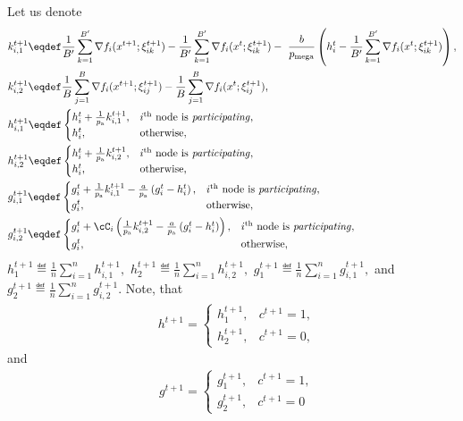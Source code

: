 \documentclass{article}
\newcommand*{\probavailable}{\ensuremath{p_{\textnormal{a}}}}
\newcommand*{\probmega}{\ensuremath{p_{\text{mega}}}}
\begin{document}
Let us denote
\begin{align*}
    &k^{t+1}_{i, 1} \eqdef \frac{1}{B'} \sum_{k=1}^{B'} \nabla f_i(x^{t+1};\xi_{ik}^{t+1}) - \frac{1}{B'} \sum_{k=1}^{B'} \nabla f_i(x^{t};\xi_{ik}^{t+1})-~\frac{b}{\probmega}\left(h^t_i - \frac{1}{B'} \sum_{k=1}^{B'} \nabla f_i(x^{t};\xi_{ik}^{t+1})\right), \\
    &k^{t+1}_{i, 2} \eqdef \frac{1}{B} \sum_{j=1}^{B}\nabla f_i(x^{t+1};\xi^{t+1}_{ij}) - \frac{1}{B} \sum_{j=1}^{B}\nabla f_i(x^{t};\xi^{t+1}_{ij}), \\
    &h^{t+1}_{i,1} \eqdef \begin{cases}
        h^t_i + \frac{1}{\probavailable} k^{t+1}_{i, 1},& i^{\textnormal{th}} \textnormal{ node is \textit{participating}}, \\
        h^t_i, & \textnormal{otherwise},
    \end{cases}  \\
    &h^{t+1}_{i,2} \eqdef \begin{cases}
        h^t_i + \frac{1}{\probavailable} k^{t+1}_{i, 2},& i^{\textnormal{th}} \textnormal{ node is \textit{participating}}, \\
        h^t_i, & \textnormal{otherwise},
    \end{cases}  \\
    &g^{t+1}_{i,1} \eqdef \begin{cases}
      g^{t}_i + \frac{1}{\probavailable}k^{t+1}_{i, 1} - \frac{a}{\probavailable} \left(g^t_i - h^t_i\right),& i^{\textnormal{th}} \textnormal{ node is \textit{participating}}, \\
      g^t_i, & \textnormal{otherwise},
    \end{cases}  \\
    &g^{t+1}_{i,2} \eqdef \begin{cases}
        g^t_i + \cC_i\left(\frac{1}{\probavailable}k^{t+1}_{i, 2} - \frac{a}{\probavailable} \left(g^t_i - h^{t}_i\right)\right),& i^{\textnormal{th}} \textnormal{ node is \textit{participating}}, \\
        g^t_i, & \textnormal{otherwise},
    \end{cases}  \\
\end{align*}
$h^{t+1}_{1} \eqdef \frac{1}{n}\sum_{i=1}^n h^{t+1}_{i,1},$ $h^{t+1}_{2} \eqdef \frac{1}{n}\sum_{i=1}^n h^{t+1}_{i,2},$ $g^{t+1}_{1} \eqdef \frac{1}{n}\sum_{i=1}^n g^{t+1}_{i,1},$ and $g^{t+1}_{2} \eqdef \frac{1}{n}\sum_{i=1}^n g^{t+1}_{i,2}.$ Note, that
\begin{align*}
  &h^{t+1} = \begin{cases}
    h^{t+1}_{1},& c^{t+1} = 1, \\
    h^{t+1}_{2},& c^{t+1} = 0,
\end{cases}
\end{align*}
and
\begin{align*}
  &g^{t+1} = \begin{cases}
    g^{t+1}_{1},& c^{t+1} = 1, \\
    g^{t+1}_{2},& c^{t+1} = 0 
\end{cases}
\end{align*}
\end{document}
